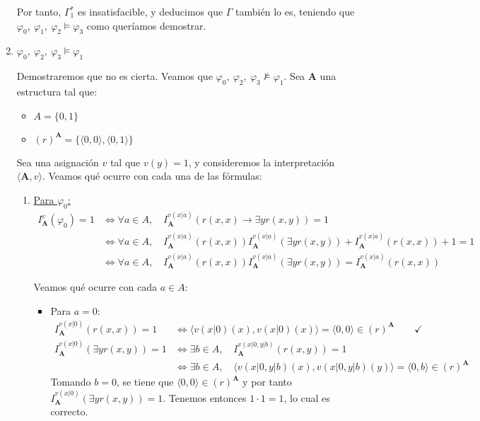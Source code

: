 \documentclass[12pt]{article}
\renewcommand{\bf}[1]{\mathbf{#1}}
\begin{document}
\begin{ejercicio}
\begin{enumerate}
            Por tanto, $\Gamma_1^\ast$ es insatisfacible, y deducimos que $\Gamma$ también lo es, teniendo que
            $\varphi_0,~\varphi_1,~\varphi_2 \models \varphi_3$ como queríamos demostrar.
    
            \item $\varphi_0,~\varphi_2,~\varphi_3 \models \varphi_1$
            
            Demostraremos que no es cierta. Veamos que $\varphi_0,~\varphi_2,~\varphi_3 \not\models \varphi_1$. Sea $\bf{A}$ una estructura tal que:
            \begin{itemize}
                \item $A=\{0,1\}$
                \item $(r)^{\bf{A}}=\{\langle 0,0\rangle, \langle 0,1\rangle\}$
            \end{itemize}
    
            Sea una asignación $v$ tal que $v(y)=1$, y consideremos la interpretación $\langle \bf{A},v\rangle$.
            Veamos qué ocurre con cada una de las fórmulas:
            \begin{enumerate}
                \item \underline{Para $\varphi_0$:}
                \begin{align*}
                    I_{\bf{A}}^v(\varphi_0) = 1 & \Longleftrightarrow \forall a\in A,\quad I_{\bf{A}}^{v(x|a)}(r(x, x) \rightarrow \exists y r(x, y))=1\\
                    & \Longleftrightarrow \forall a\in A,\quad I_{\bf{A}}^{v(x|a)}(r(x, x))I_{\bf{A}}^{v(x|a)}(\exists y r(x, y)) + I_{\bf{A}}^{v(x|a)}(r(x, x))+1=1\\
                    & \Longleftrightarrow \forall a\in A,\quad I_{\bf{A}}^{v(x|a)}(r(x, x))I_{\bf{A}}^{v(x|a)}(\exists y r(x, y)) = I_{\bf{A}}^{v(x|a)}(r(x, x))
                \end{align*}
    
                Veamos qué ocurre con cada $a\in A$:
                \begin{itemize}
                    \item Para $a=0$:
                    \begin{align*}
                        I_{\bf{A}}^{v(x|0)}(r(x, x)) = 1 & \Longleftrightarrow \langle v(x|0)(x),v(x|0)(x)\rangle = \langle 0,0\rangle\in (r)^{\bf{A}} \qquad \checkmark \\
                        I_{\bf{A}}^{v(x|0)}(\exists y r(x, y)) = 1 & \Longleftrightarrow \exists b\in A,\quad I_{\bf{A}}^{v(x|0,y|b)}(r(x, y)) = 1\\
                        & \Longleftrightarrow \exists b\in A,\quad \langle v(x|0,y|b)(x),v(x|0,y|b)(y)\rangle = \langle 0,b\rangle\in (r)^{\bf{A}}
                    \end{align*}
                    Tomando $b=0$, se tiene que $\langle 0,0\rangle\in (r)^{\bf{A}}$ y por tanto $I_{\bf{A}}^{v(x|0)}(\exists y r(x, y))=1$.
                    Tenemos entonces $1\cdot 1 = 1$, lo cual es correcto.
    

\end{itemize}
\end{enumerate}
\end{enumerate}
\end{ejercicio}
\end{document}
